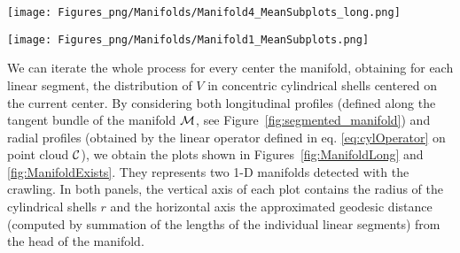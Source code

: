 \begin{sidewaysfigure}
  \centering
  \texttt{[image: Figures\_png/Manifolds/Manifold4\_MeanSubplots\_long.png]}
  \caption{}
  \label{fig:ManifoldLong}
\end{sidewaysfigure}

\begin{sidewaysfigure}
  \centering
  \texttt{[image: Figures\_png/Manifolds/Manifold1\_MeanSubplots.png]}
  \caption{}
  \label{fig:ManifoldExists}
\end{sidewaysfigure}

%

We can iterate the whole process for every center the manifold, obtaining for each linear segment, the distribution of $V$ in concentric cylindrical shells centered on the current center.
By considering both longitudinal profiles (defined along the tangent bundle of the manifold $\mathcal{M}$, see Figure~\ref{fig:segmented_manifold}) and radial profiles (obtained by the linear operator defined in eq. \ref{eq:cylOperator} on point cloud $\mathcal{C}$), we obtain the plots shown in Figures~\ref{fig:ManifoldLong} and \ref{fig:ManifoldExists}.
They represents two 1-D manifolds detected with the crawling.
In both panels, the vertical axis of each plot contains the radius of the cylindrical shells $r$
and the horizontal axis the approximated geodesic distance (computed by summation of the lengths of the individual linear segments) from the head of the manifold.

